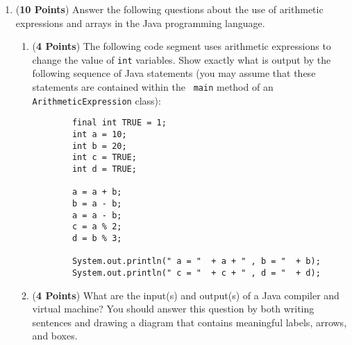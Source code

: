 \documentclass[12pt]{article}
\begin{document}
\begin{enumerate}
\begin{enumerate}
\begin{enumerate}
\item {\tt BankAccount account3 = new BankAccount();} \\
  {\tt account3.deposit(1200);} \\
  {\tt account3.deposit(account3.getBalance());}

\end{enumerate}

\item \label{values_refs} ({\bf 4 Points}) The Java programming
  language includes primitive data types like {\tt double} and objects
  like {\tt Double}.  Furthermore, it also allows for the creation of
  new classes like {\tt BankAccount} and {\tt CheckingAccount}.  Show
  what the output will be when the {\tt main} method inside of the
  {\tt ValuesAndReferences} class is executed.  Clearly state why the
  output will look the way that you suggest.

\end{enumerate}

\newpage

\item ({\bf 10 Points}) Answer the following questions about the use
  of arithmetic expressions and arrays in the Java programming
  language.

\begin{enumerate}

\item ({\bf 4 Points}) The following code segment uses arithmetic
  expressions to change the value of {\tt int} variables.  Show
  exactly what is output by the following sequence of Java statements
  (you may assume that these statements are contained within the {\tt
    main} method of an {\tt ArithmeticExpression} class):

\begin{verbatim}
        final int TRUE = 1;
        int a = 10;
        int b = 20;
        int c = TRUE;
        int d = TRUE;

        a = a + b;
        b = a - b;
        a = a - b;
        c = a % 2;
        d = b % 3;

        System.out.println(" a = "  + a + " , b = "  + b);
        System.out.println(" c = "  + c + " , d = "  + d);
\end{verbatim}

\item ({\bf 4 Points}) What are the input(s) and output(s) of a Java compiler and virtual machine?  You should answer
  this question by both writing sentences and drawing a diagram that contains meaningful labels, arrows, and boxes.


\end{enumerate}
\end{enumerate}
\end{document}

